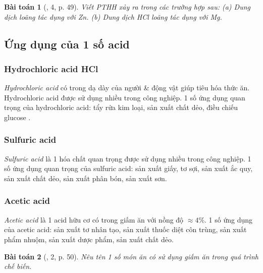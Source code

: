 \documentclass{article}
\newtheorem{baitoan}{Bài toán}
\begin{document}
\begin{baitoan}[\cite{SGK_KHTN_8_Canh_Dieu}, 4, p. 49]
	Viết PTHH xảy ra trong các trường hợp sau: (a) Dung dịch \emph{} loãng tác dụng với \emph{Zn}. (b) Dung dịch \emph{HCl} loãng tác dụng với \emph{Mg}.
\end{baitoan}

\subsection{Ứng dụng của 1 số acid}

\subsubsection{Hydrochloric acid HCl}
\textit{Hydrochloric acid} có trong dạ dày của người \& động vật giúp tiêu hóa thức ăn. Hydrochloric acid được sử dụng nhiều trong công nghiệp. 1 số ứng dụng quan trọng của hydrochloric acid: tẩy rửa kim loại, sản xuất chất dẻo, điều chiếu glucose .

\subsubsection{Sulfuric acid }
\textit{Sulfuric acid} là 1 hóa chất quan trọng được sử dụng nhiều trong công nghiệp. 1 số ứng dụng quan trọng của sulfuric acid: sản xuất giấy, tơ sợi, sản xuất ắc quy, sản xuất chất dẻo, sản xuất phân bón, sản xuất sơn.

\subsubsection{Acetic acid }
\textit{Acetic acid} là 1 acid hữu cơ có trong giấm ăn với nồng độ $\approx4$\%. 1 số ứng dụng của acetic acid: sản xuất tơ nhân tạo, sản xuất thuốc diệt côn trùng, sản xuất phẩm nhuộm, sản xuất dược phẩm, sản xuất chất dẻo.

\begin{baitoan}[\cite{SGK_KHTN_8_Canh_Dieu}, 2, p. 50]
	Nêu tên 1 số món ăn có sử dụng giấm ăn trong quá trình chế biến.
\end{baitoan}
\noindent{}
\end{document}
